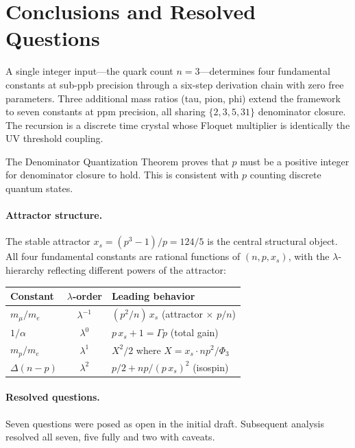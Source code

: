 \documentclass[12pt,a4paper]{article}
\theoremstyle{definition}
\newcommand{\Phithree}{\Phi_3}
\begin{document}
\section{Conclusions and Resolved Questions}

A single integer input---the quark count $n = 3$---determines four
fundamental constants at sub-ppb precision through a six-step derivation
chain with zero free parameters. Three additional mass ratios (tau, pion,
phi) extend the framework to seven constants at ppm precision, all sharing
$\{2, 3, 5, 31\}$ denominator closure. The recursion is a discrete time
crystal whose Floquet multiplier is identically the UV threshold coupling.

The Denominator Quantization Theorem proves that $p$ must be a positive
integer for denominator closure to hold. This is consistent with $p$
counting discrete quantum states.

\paragraph{Attractor structure.}
The stable attractor $x_s = (p^3 - 1)/p = 124/5$ is the central structural
object. All four fundamental constants are rational functions of $(n, p, x_s)$,
with the $\lambda$-hierarchy reflecting different powers of the attractor:
\begin{center}
\begin{tabular}{lcl}
\toprule
Constant & $\lambda$-order & Leading behavior \\
\midrule
$m_\mu/m_e$ & $\lambda^{-1}$ & $(p^2/n)\,x_s$ \quad (attractor $\times$ $p/n$) \\
$1/\alpha$   & $\lambda^0$    & $p\,x_s + 1 = \Gamma p$ \quad (total gain) \\
$m_p/m_e$    & $\lambda^1$    & $X^2/2$ where $X = x_s\cdot np^2/\Phithree$ \\
$\Delta(n{-}p)$ & $\lambda^2$ & $p/2 + np/(p\,x_s)^2$ \quad (isospin) \\
\bottomrule
\end{tabular}
\end{center}

\paragraph{Resolved questions.}
Seven questions were posed as open in the initial draft.
Subsequent analysis resolved all seven, five fully and two with caveats.
\end{document}

